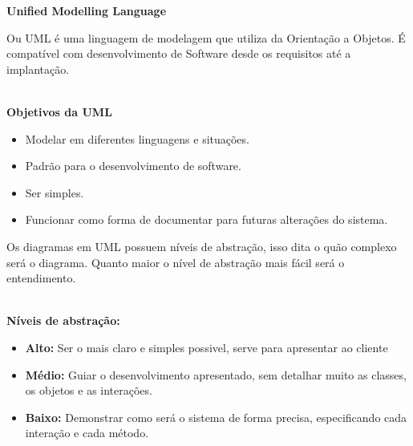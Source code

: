 \documentclass[12pt, a4paper]{article}
\begin{document}
\noindent
\textbf{Unified Modelling Language}

Ou UML é uma linguagem de modelagem que utiliza da Orientação a Objetos.
É compatível com desenvolvimento de Software desde os requisitos até a implantação.

\noindent
\textbf{\\Objetivos da UML}
\begin{itemize}
    \item Modelar em diferentes linguagens e situações.
    \item Padrão para o desenvolvimento de software.
    \item Ser simples.
    \item Funcionar como forma de documentar para futuras alterações do sistema.
\end{itemize}

Os diagramas em UML possuem níveis de abstração, isso dita o quão complexo será o diagrama.
Quanto maior o nível de abstração mais fácil será o entendimento.

\noindent
\textbf{\\Níveis de abstração: }
\begin{itemize}
    \item \textbf{Alto:} Ser o mais claro e simples possivel, serve para apresentar ao cliente
    \item \textbf{Médio:} Guiar o desenvolvimento apresentado, 
    sem detalhar muito as classes, os objetos e as interações.
    \item \textbf{Baixo:} Demonstrar como será o sistema de forma precisa, 
    especificando cada interação e cada método.
\end{itemize}
\end{document}
